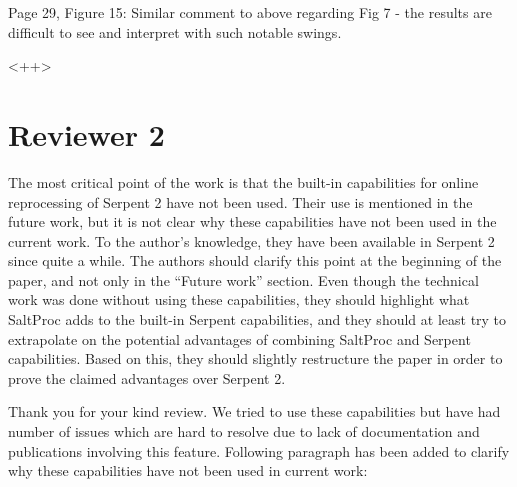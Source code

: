 \documentclass[answers,11pt]{exam}
\begin{document}
\begin{questions}
        \question  Page 29, Figure 15: Similar comment to above regarding Fig 7 
        - the results are difficult to see and interpret with such notable 
        swings.
        \begin{solution}
                <++>
        \end{solution}





        \section*{Reviewer 2}


        \question The most critical point of the work is that the built-in 
        capabilities for online reprocessing of Serpent 2 have not been used. 
        Their use is mentioned in the future work, but it is not clear why 
        these capabilities have not been used in the current work. To the 
        author's knowledge, they have been available in Serpent 2 since quite a 
        while. The authors should clarify this point at the beginning of the 
        paper, and not only in the ``Future work'' section. Even though the 
        technical work was done without using these capabilities, they should 
        highlight what  SaltProc adds to the built-in Serpent capabilities, and 
        they should at least try to extrapolate on the potential advantages of 
        combining  SaltProc and Serpent capabilities. Based on this, they 
        should slightly restructure the paper in order to prove the claimed 
        advantages over Serpent 2.
        \begin{solution}
                Thank you for your kind review. We tried to use these capabilities 
                \cite{rykhlevskii_online_2017} but have had number of issues which 
                are hard to resolve due to lack of documentation and publications 
                involving this feature. Following paragraph has been added to 
                clarify why these capabilities have not been used in current work:
                

\end{solution}
\end{questions}
\end{document}
